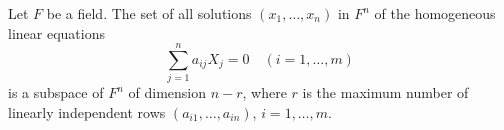 Let $F$ be a field. The set of all solutions $(x_1, \ldots, x_n)$ in $F^n$ of the homogeneous linear equations
$$\sum_{j=1}^{n} a_{ij} X_j = 0 \quad (i = 1, \ldots, m)$$
is a subspace of $F^n$ of dimension $n - r$, where $r$ is the maximum number of linearly independent rows $(a_{i1}, \ldots, a_{in})$, $i = 1, \ldots, m$.

